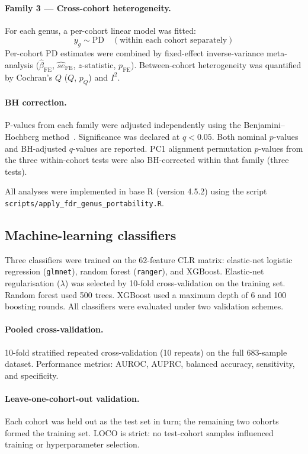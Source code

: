 \documentclass[12pt,a4paper]{article}
\begin{document}
\paragraph{Family 3 --- Cross-cohort heterogeneity.}
For each genus, a per-cohort linear model was fitted:
\[
y_g \sim \mathrm{PD} \quad (\text{within each cohort separately})
\]
Per-cohort PD estimates were combined by fixed-effect inverse-variance
meta-analysis ($\hat\beta_{\mathrm{FE}}$, $\hat{se}_{\mathrm{FE}}$,
$z$-statistic, $p_{\mathrm{FE}}$). Between-cohort heterogeneity was
quantified by Cochran's $Q$ ($Q$, $p_Q$) and $I^2$.

\paragraph{BH correction.}
P-values from each family were adjusted independently using the
Benjamini--Hochberg method~\cite{Benjamini1995}. Significance was declared
at $q < 0.05$. Both nominal $p$-values and BH-adjusted $q$-values are
reported. PC1 alignment permutation $p$-values from the three within-cohort
tests were also BH-corrected within that family (three tests).

All analyses were implemented in base R (version 4.5.2) using the script
\texttt{scripts/apply\_fdr\_genus\_portability.R}.

\subsection{Machine-learning classifiers}

Three classifiers were trained on the 62-feature CLR matrix: elastic-net
logistic regression (\texttt{glmnet}), random forest (\texttt{ranger}), and
XGBoost. Elastic-net regularisation ($\lambda$) was selected by 10-fold
cross-validation on the training set. Random forest used 500 trees.
XGBoost used a maximum depth of 6 and 100 boosting rounds. All classifiers
were evaluated under two validation schemes.

\paragraph{Pooled cross-validation.}
10-fold stratified repeated cross-validation (10 repeats) on the full
683-sample dataset. Performance metrics: AUROC, AUPRC, balanced accuracy,
sensitivity, and specificity.

\paragraph{Leave-one-cohort-out validation.}
Each cohort was held out as the test set in turn; the remaining two cohorts
formed the training set. LOCO is strict: no test-cohort samples influenced
training or hyperparameter selection.
\end{document}
